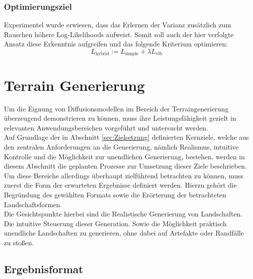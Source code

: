 \subsubsection {Optimierungsziel}

Experimentel wurde erwiesen, dass das Erlernen der Varianz zusätzlich zum Rauschen höhere Log-Likelihoods aufweist. Somit soll auch der hier verfolgte Ansatz diese Erkenntnis aufgreifen und das folgende Kriterium optimieren:
\begin{equation}
    L_\text{hybrid} := L_\text{simple} + \lambda L_\text{vlb}
\end{equation}



\section {Terrain Generierung}
\label{sec:Terraingenerierung}

Um die Eignung von Diffusionsmodellen im Bereich der Terraingenerierung überzeugend demonstrieren zu können, muss ihre Leistungsfähigkeit gezielt in relevanten Anwendungsbereichen vorgeführt und untersucht werden. \\
Auf Grundlage der in Abschnitt \ref{sec:Zielsetzung} definierten Kernziele, welche aus den zentralen Anforderungen an die Generierung, nämlich Realismus, intuitive Kontrolle und die Möglichkeit zur unendlichen Generierung, bestehen, werden in diesem Abschnitt die geplanten Prozesse zur Umsetzung dieser Ziele beschrieben. \\
Um diese Bereiche allerdings überhaupt zielführend betrachten zu können, muss zuerst die Form der erwarteten Ergebnisse definiert werden. Hierzu gehört die Begründung des gewählten Formats sowie die Erörterung der betrachteten Landschaftsformen. \\
Die Gesichtspunkte hierbei sind die Realistische Generierung von Landschaften. Die intuitive Steuerung dieser Generation. Sowie die Möglichkeit praktisch unendliche Landschaften zu generieren, ohne dabei auf Artefakte oder Randfälle zu stoßen. 

\subsection {Ergebnisformat}

